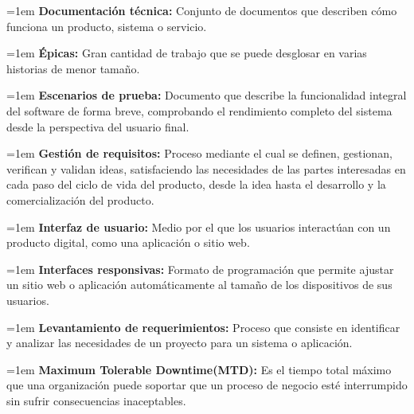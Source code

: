 \documentclass[12pt,letterpaper,spanish, xcolor=table]{report}
\numberwithin{figure}{subsection}
\begin{document}
	
	{\leftskip=1em 
		\noindent 
		\textbf{Documentación técnica:} Conjunto de documentos que describen cómo funciona un producto, sistema o servicio.\\
	\par}
	
	
	{\leftskip=1em 
		\noindent 
		\textbf{Épicas:} Gran cantidad de trabajo que se puede desglosar en varias historias de menor tamaño. \\
	\par}
	
	
	{\leftskip=1em 
		\noindent 
		\textbf{Escenarios de prueba:} Documento que describe la funcionalidad integral del software de forma breve, comprobando el rendimiento completo del sistema desde la perspectiva del usuario final.\\
	\par}
	
	
	{\leftskip=1em 
		\noindent 
		\textbf{Gestión de requisitos:} Proceso mediante el cual se definen, gestionan, verifican y validan ideas, satisfaciendo las necesidades de las partes interesadas en cada paso del ciclo de vida del producto, desde la idea hasta el desarrollo y la comercialización del producto. \\
	\par}
	
	
	{\leftskip=1em 
		\noindent 
		\textbf{Interfaz de usuario:} Medio por el que los usuarios interactúan con un producto digital, como una aplicación o sitio web.\\
	\par}
	
	
	{\leftskip=1em 
		\noindent 
		\textbf{Interfaces responsivas:} Formato de programación que permite ajustar un sitio web o aplicación automáticamente al tamaño de los dispositivos de sus usuarios.\\
	\par}
	
	
	{\leftskip=1em 
		\noindent 
		\textbf{Levantamiento de requerimientos:} Proceso que consiste en identificar y analizar las necesidades de un proyecto para un sistema o aplicación.\\
	\par}
	
	{\leftskip=1em 
		\noindent 
		\textbf{Maximum Tolerable Downtime(MTD):} Es el tiempo total máximo que una organización puede soportar que un proceso de negocio esté interrumpido sin sufrir consecuencias inaceptables. \\
	\par}
	
\end{document}

